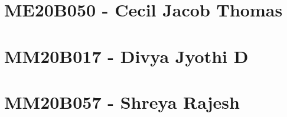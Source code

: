 \documentclass[12pt]{article}
\begin{document}
\section{ME20B050 - Cecil Jacob Thomas}


\section{MM20B017 - Divya Jyothi D}

\newpage

\section{MM20B057 - Shreya Rajesh}


\newpage



\end{document}
